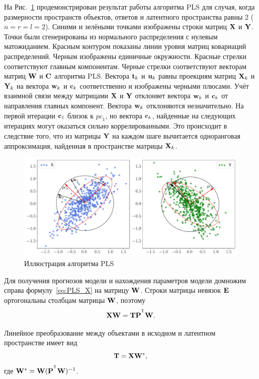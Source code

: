 На Рис.~\ref{fig:PLSFigure} продемонстрирован результат работы алгоритма PLS для случая, когда размерности пространств объектов, ответов и латентного пространства равны 2 ($n = r = l = 2$).
Синими и зелёными точками изображены строки матриц $\mathbf{X}$ и $\mathbf{Y}$. 
Точки были сгенерированы из нормального распределения с нулевым матожиданием. 
Красным контуром показаны линии уровня матриц ковариаций распределений. 
Черным изображены единичные окружности. 
Красные стрелки соответствуют главным компонентам. 
Черные стрелки соответствуют векторам матриц $\mathbf{W}$ и $\mathbf{C}$ алгоритма PLS. 
Вектора $\mathbf{t}_k$ и $\mathbf{u}_k$ равны проекциям матриц $\mathbf{X}_k$ и $\mathbf{Y}_k$ на вектора $\mathbf{w}_k$ и $\mathbf{c}_k$ соответственно и изображены черными плюсами. 
Учёт взаимной связи между матрицами $\mathbf{X}$ и $\mathbf{Y}$ отклоняет вектора $\mathbf{w}_k$ и $\mathbf{c}_k$ от направления главных компонент. 
Вектора $\mathbf{w}_k$ отклоняются незначительно. 
На первой итерации $\mathbf{c}_1$ близок к $\textit{pc}_1$, но вектора $\mathbf{c}_k$, найденные на следующих итерациях могут оказаться сильно коррелированными. Это происходит в следствие того, что из матрицы $\mathbf{Y}$ на каждом шаге вычитается одноранговая аппроксимация, найденная в пространстве матрицы $\mathbf{X}_k$.
\begin{figure}[h]
	\centering
	\includegraphics[width=\linewidth]{figs/ch1/PLSFigure}
	\caption{Иллюстрация алгоритма PLS}
	\label{fig:PLSFigure}
\end{figure}

Для получения прогнозов модели и нахождения параметров модели 
домножим справа формулу~\eqref{eq:PLS_X} на матрицу $\mathbf{W}$. Строки матрицы невязок $\mathbf{E}$ ортогональны столбцам матрицы $\mathbf{W}$, поэтому 
\[
\bX \bW = \bT \bP^{\T} \bW.
\] 


Линейное преобразование между объектами в исходном и латентном пространстве имеет вид
\begin{equation}
\mathbf{T} = \mathbf{X} \mathbf{W}^*,
\label{eq:W*}
\end{equation}
где $\bW^* = \bW (\bP^{\T} \bW)^{-1}$. 

